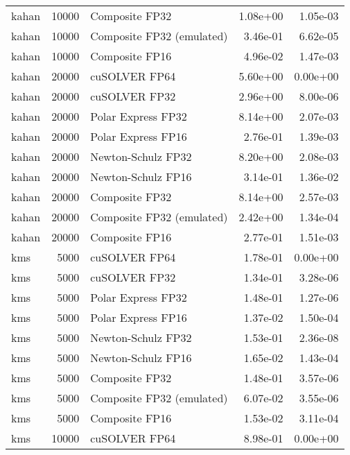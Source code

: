\begin{table}
\begin{tabular}{lrlrr}
    kahan & 10000 &            Composite FP32 &  1.08e+00 &        1.05e-03 \\
    kahan & 10000 & Composite FP32 (emulated) &  3.46e-01 &        6.62e-05 \\
    kahan & 10000 &            Composite FP16 &  4.96e-02 &        1.47e-03 \\
    kahan & 20000 &             cuSOLVER FP64 &  5.60e+00 &        0.00e+00 \\
    kahan & 20000 &             cuSOLVER FP32 &  2.96e+00 &        8.00e-06 \\
    kahan & 20000 &        Polar Express FP32 &  8.14e+00 &        2.07e-03 \\
    kahan & 20000 &        Polar Express FP16 &  2.76e-01 &        1.39e-03 \\
    kahan & 20000 &        Newton-Schulz FP32 &  8.20e+00 &        2.08e-03 \\
    kahan & 20000 &        Newton-Schulz FP16 &  3.14e-01 &        1.36e-02 \\
    kahan & 20000 &            Composite FP32 &  8.14e+00 &        2.57e-03 \\
    kahan & 20000 & Composite FP32 (emulated) &  2.42e+00 &        1.34e-04 \\
    kahan & 20000 &            Composite FP16 &  2.77e-01 &        1.51e-03 \\
      kms &  5000 &             cuSOLVER FP64 &  1.78e-01 &        0.00e+00 \\
      kms &  5000 &             cuSOLVER FP32 &  1.34e-01 &        3.28e-06 \\
      kms &  5000 &        Polar Express FP32 &  1.48e-01 &        1.27e-06 \\
      kms &  5000 &        Polar Express FP16 &  1.37e-02 &        1.50e-04 \\
      kms &  5000 &        Newton-Schulz FP32 &  1.53e-01 &        2.36e-08 \\
      kms &  5000 &        Newton-Schulz FP16 &  1.65e-02 &        1.43e-04 \\
      kms &  5000 &            Composite FP32 &  1.48e-01 &        3.57e-06 \\
      kms &  5000 & Composite FP32 (emulated) &  6.07e-02 &        3.55e-06 \\
      kms &  5000 &            Composite FP16 &  1.53e-02 &        3.11e-04 \\
      kms & 10000 &             cuSOLVER FP64 &  8.98e-01 &        0.00e+00 \\

\end{tabular}
\end{table}

